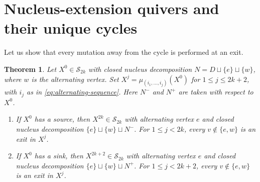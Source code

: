 \documentclass[10pt,a4paper]{amsart}
\newtheorem{theorem}{Theorem}[section]
\theoremstyle{definition}
\theoremstyle{definition}
\numberwithin{equation}{section}
\numberwithin{table}{section}
\newcommand{\nminus}{N^{-}}
\newcommand{\nplus}{N^{+}}
\newcommand{\Sclass}{\mathcal{S}}
\newcommand{\Xj}[1]{X^{#1}}
\begin{document}
\section{Nucleus-extension quivers and their unique cycles}\label{sec:cycle}

Let us show that every mutation away from the cycle is performed at an exit.

\begin{theorem}\label{thm:s-alternating-mutations}
Let $\Xj{0}\in\Sclass_{2k}$ with closed nucleus decomposition
$N=D\sqcup\{e\}\sqcup\{w\}$, where $w$ is the alternating vertex. Set $\Xj{j}=\mu_{(i_1,\ldots,i_j)}(\Xj{0})$ for
$1\le j\le2k+2$, with $i_j$ as in \eqref{eq:alternating-sequence}.
Here $\nminus$ and $\nplus$ are taken with respect to $\Xj{0}$.
\begin{enumerate}[label=\textup{(\roman*)},leftmargin=2.4em,itemsep=4pt]
\item If $\Xj{0}$ has a source, then $\Xj{2k}\in\Sclass_{2k}$ with alternating
vertex $e$ and closed nucleus decomposition \mbox{$\{e\}\sqcup\{w\}\sqcup\nminus$}.
For $1\le j<2k$, every $v\notin\{e,w\}$ is an exit in $\Xj{j}$.
\item If $\Xj{0}$ has a sink, then $\Xj{2k+2}\in\Sclass_{2k}$ with alternating
vertex $e$ and closed nucleus decomposition \mbox{$\{e\}\sqcup\{w\}\sqcup\nplus$}.
For $1\le j<2k+2$, every $v\notin\{e,w\}$ is an exit in $\Xj{j}$.
\end{enumerate}
\end{theorem}
\end{document}
